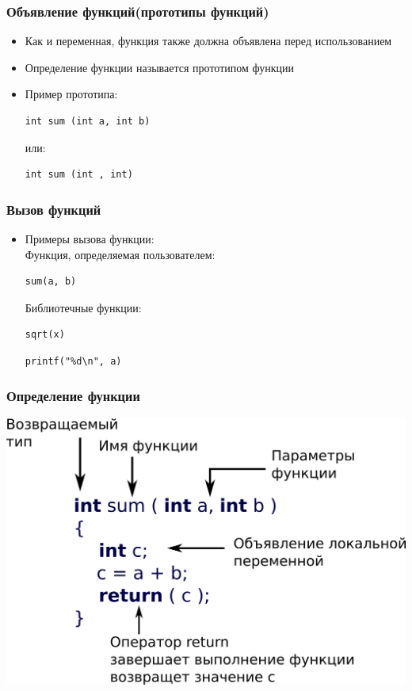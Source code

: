 \documentclass[14pt,pdf,hyperref={unicode}]{beamer}
\begin{document}
\begin{frame}[fragile]
\frametitle{Объявление функций(прототипы функций)} 
\begin{itemize}
\item Как и переменная, функция также должна объявлена перед использованием
\item Определение функции называется прототипом функции
\item Пример прототипа:\\
\begin{lstlisting}
int sum (int a, int b)
\end{lstlisting}
или:
\begin{lstlisting}
int sum (int , int)
\end{lstlisting}
\end{itemize}
\end{frame}


\begin{frame}[fragile]
\frametitle{Вызов функций} 
\begin{itemize}
\item Примеры вызова функции:\\
Функция, определяемая пользователем:\\
\begin{lstlisting}
sum(a, b)
\end{lstlisting}
Библиотечные функции:\\
\begin{lstlisting}
sqrt(x)
\end{lstlisting}
\begin{lstlisting}
printf("%d\n", a)
\end{lstlisting}
\end{itemize}
\end{frame}



\begin{frame}[fragile]
\frametitle{Определение функции} 
\begin{center}
\includegraphics[width=0.8\linewidth]{images/function_syntax.png}
\end{center}
\end{frame}
\end{document}
